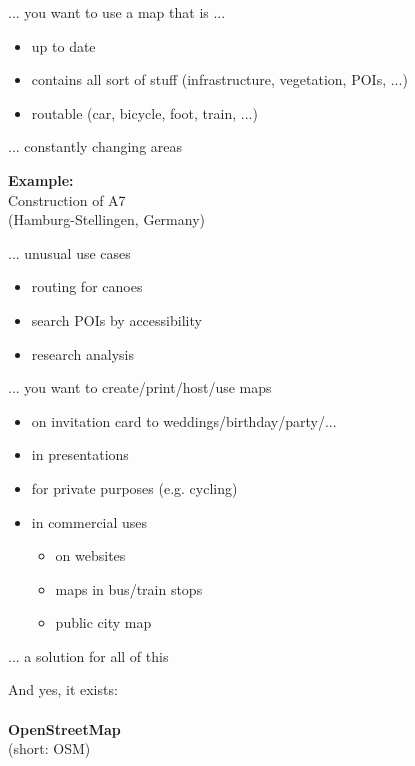 \documentclass{beamer}
\begin{document}
			\begin{frame}{... you want to use a map that is ...}
				\begin{itemize}
					\item up to date\pause
					\item contains all sort of stuff (infrastructure, vegetation, POIs, ...)\pause
					\item routable (car, bicycle, foot, train, ...)
				\end{itemize}
			\end{frame}
			
			\begin{frame}{... constantly changing areas}
				\begin{center}
					\textbf{Example:}\\
					Construction of A7\\
					{\tiny (Hamburg-Stellingen, Germany)}
				\end{center}
			\end{frame}
		
			\begin{frame}{... unusual use cases}
				\begin{itemize}
					\item routing for canoes
					\item search POIs by accessibility
					\item research analysis
				\end{itemize}
			\end{frame}
		
			\begin{frame}{... you want to create/print/host/use maps}
				\begin{itemize}
					\item on invitation card to weddings/birthday/party/...
					\item in presentations
					\item for private purposes (e.g. cycling)
					\item in commercial uses
					\begin{itemize}
						\item on websites
						\item maps in bus/train stops
						\item public city map
					\end{itemize}
				\end{itemize}
			\end{frame}
		
			\begin{frame}{... a solution for all of this}
				\begin{center}
					And yes, it exists:\\
					\hfill\\
					\textbf{OpenStreetMap}\\
					{\tiny (short: OSM)}
				\end{center}
			\end{frame}
\end{document}
